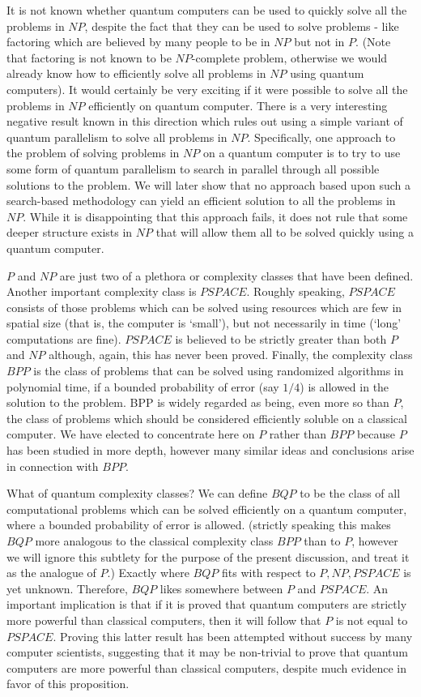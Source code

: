 \documentclass[12pt, oneside]{book}
\theoremstyle{definition}
\theoremstyle{definition}
\theoremstyle{remark}
\begin{document}
It is not known whether quantum computers can be used to quickly solve all the problems in $NP$, despite the fact that they can be used to solve problems - like factoring which are believed by many people to be in $NP$ but not in $P$. (Note that factoring is not known to be $NP$-complete problem, otherwise we would already know how to efficiently solve all problems in $NP$ using quantum computers). It would certainly be very exciting if it were possible to solve all the problems in $NP$ efficiently on quantum computer. There is a very interesting negative result known in this direction which rules out using a simple variant of quantum parallelism to solve all problems in $NP$. Specifically, one approach to the problem of solving problems in $NP$ on a quantum computer is to try to use some form of quantum parallelism to search in parallel through all possible solutions to the problem. We will later show that no approach based upon such a search-based methodology can yield an efficient solution to all the problems in $NP$. While it is disappointing that this approach fails, it does not rule that some deeper structure exists in $NP$ that will allow them all to be solved quickly using a quantum computer.

$P$ and $NP$ are just two of a plethora or complexity classes that have been defined. Another important complexity class is $PSPACE$. Roughly speaking, $PSPACE$ consists of those problems which can be solved using resources which are few in spatial size (that is, the computer is `small'), but not necessarily in time (`long' computations are fine). $PSPACE$ is believed to be strictly greater than both $P$ and $NP$ although, again, this has never been proved. Finally, the complexity class $BPP$ is the class of problems that can be solved using randomized algorithms in polynomial time, if a bounded probability of error (say $1/4$) is allowed in the solution to the problem. BPP is widely regarded as being, even more so than $P$, the class of problems which should be considered efficiently soluble on a classical computer. We have elected to concentrate here on $P$ rather than $BPP$ because $P$ has been studied in more depth, however many similar ideas and conclusions arise in connection with $BPP$.

What of quantum complexity classes? We can define $BQP$ to be the class of all computational problems which can be solved efficiently on a quantum computer, where a bounded probability of error is allowed. (strictly speaking this makes $BQP$ more analogous to the classical complexity class $BPP$ than to $P$, however we will ignore this subtlety for the purpose of the present discussion, and treat it as the analogue of $P$.) Exactly where $BQP$ fits with respect to $P, NP, PSPACE$ is yet unknown. Therefore, $BQP$ likes somewhere between $P$ and $PSPACE$. An important implication is that if it is proved that quantum computers are strictly more powerful than classical computers, then it will follow that $P$ is not equal to $PSPACE$. Proving this latter result has been attempted without success by many computer scientists, suggesting that it may be non-trivial to prove that quantum computers are more powerful than classical computers, despite much evidence in favor of this proposition.
\end{document}
